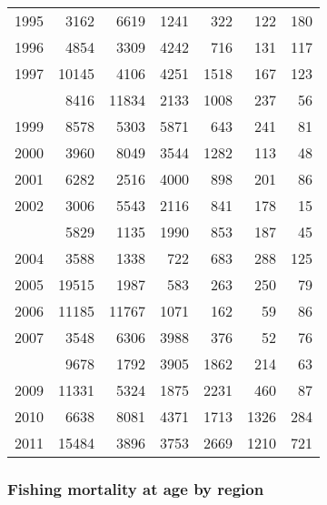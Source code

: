 \documentclass[
]{article}
\begin{document}
\begin{longtable}[t]{lrrrrrr}
1995 & 3162 & 6619 & 1241 & 322 & 122 & 180\\
1996 & 4854 & 3309 & 4242 & 716 & 131 & 117\\
1997 & 10145 & 4106 & 4251 & 1518 & 167 & 123\\
\addlinespace
1998 & 8416 & 11834 & 2133 & 1008 & 237 & 56\\
1999 & 8578 & 5303 & 5871 & 643 & 241 & 81\\
2000 & 3960 & 8049 & 3544 & 1282 & 113 & 48\\
2001 & 6282 & 2516 & 4000 & 898 & 201 & 86\\
2002 & 3006 & 5543 & 2116 & 841 & 178 & 15\\
\addlinespace
2003 & 5829 & 1135 & 1990 & 853 & 187 & 45\\
2004 & 3588 & 1338 & 722 & 683 & 288 & 125\\
2005 & 19515 & 1987 & 583 & 263 & 250 & 79\\
2006 & 11185 & 11767 & 1071 & 162 & 59 & 86\\
2007 & 3548 & 6306 & 3988 & 376 & 52 & 76\\
\addlinespace
2008 & 9678 & 1792 & 3905 & 1862 & 214 & 63\\
2009 & 11331 & 5324 & 1875 & 2231 & 460 & 87\\
2010 & 6638 & 8081 & 4371 & 1713 & 1326 & 284\\
2011 & 15484 & 3896 & 3753 & 2669 & 1210 & 721\\*
\end{longtable}

\subsubsection{Fishing mortality at age by
region}\label{fishing-mortality-at-age-by-region}
\end{document}
